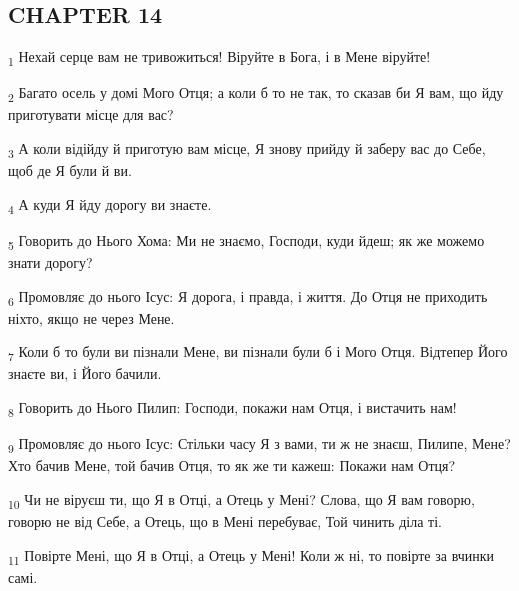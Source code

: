 \subsection{CHAPTER 14}
\begin{tcolorbox}
\textsubscript{1} Нехай серце вам не тривожиться! Віруйте в Бога, і в Мене віруйте!
\end{tcolorbox}
\begin{tcolorbox}
\textsubscript{2} Багато осель у домі Мого Отця; а коли б то не так, то сказав би Я вам, що йду приготувати місце для вас?
\end{tcolorbox}
\begin{tcolorbox}
\textsubscript{3} А коли відійду й приготую вам місце, Я знову прийду й заберу вас до Себе, щоб де Я були й ви.
\end{tcolorbox}
\begin{tcolorbox}
\textsubscript{4} А куди Я йду дорогу ви знаєте.
\end{tcolorbox}
\begin{tcolorbox}
\textsubscript{5} Говорить до Нього Хома: Ми не знаємо, Господи, куди йдеш; як же можемо знати дорогу?
\end{tcolorbox}
\begin{tcolorbox}
\textsubscript{6} Промовляє до нього Ісус: Я дорога, і правда, і життя. До Отця не приходить ніхто, якщо не через Мене.
\end{tcolorbox}
\begin{tcolorbox}
\textsubscript{7} Коли б то були ви пізнали Мене, ви пізнали були б і Мого Отця. Відтепер Його знаєте ви, і Його бачили.
\end{tcolorbox}
\begin{tcolorbox}
\textsubscript{8} Говорить до Нього Пилип: Господи, покажи нам Отця, і вистачить нам!
\end{tcolorbox}
\begin{tcolorbox}
\textsubscript{9} Промовляє до нього Ісус: Стільки часу Я з вами, ти ж не знаєш, Пилипе, Мене? Хто бачив Мене, той бачив Отця, то як же ти кажеш: Покажи нам Отця?
\end{tcolorbox}
\begin{tcolorbox}
\textsubscript{10} Чи не віруєш ти, що Я в Отці, а Отець у Мені? Слова, що Я вам говорю, говорю не від Себе, а Отець, що в Мені перебуває, Той чинить діла ті.
\end{tcolorbox}
\begin{tcolorbox}
\textsubscript{11} Повірте Мені, що Я в Отці, а Отець у Мені! Коли ж ні, то повірте за вчинки самі.
\end{tcolorbox}
